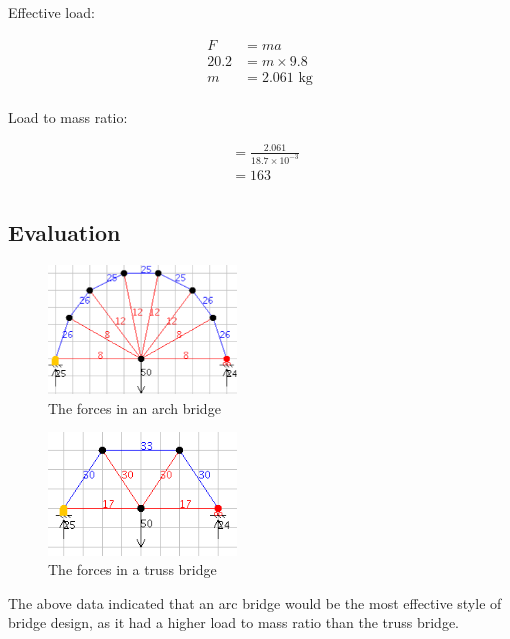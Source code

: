 \documentclass[a4paper,11pt]{article}
\begin{document}
Effective load:

$$
\begin{aligned}
F & = ma \\
20.2 & = m \times 9.8 \\
m & = 2.061\mbox{ kg} \\
\end{aligned}
$$

Load to mass ratio:

$$
\begin{aligned}
& = \frac{2.061}{18.7 \times 10^{-3}} \\
& = 163 \\
\end{aligned}
$$


\subsection{Evaluation}

\begin{figure}
\begin{center}
\includegraphics[width=5cm]{figures/arch-2.png}
\end{center}
\caption{The forces in an arch bridge}
\label{config:arch}
\end{figure}

\begin{figure}
\begin{center}
\includegraphics[width=5cm]{figures/truss-1.png}
\end{center}
\caption{The forces in a truss bridge}
\label{config:truss}
\end{figure}

The above data indicated that an arc bridge would be the most effective style of
bridge design, as it had a higher load to mass ratio than the truss bridge.
\end{document}
